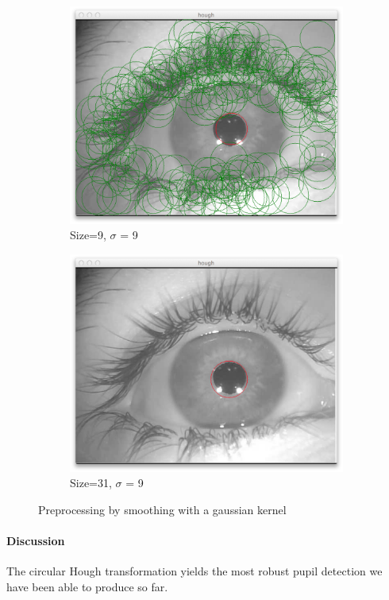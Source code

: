 \documentclass[a4paper,11pt]{article}
\begin{document}
\begin{figure}[H]
\centering
\begin{subfigure}{.5\textwidth}
  \centering
  \includegraphics[width=.8\linewidth]{houghk9s9}
  \caption{Size=9, $\sigma$ = 9}
  \label{fig:sub3}
\end{subfigure}%
\begin{subfigure}{.5\textwidth}
  \centering
  \includegraphics[width=.8\linewidth]{houghk31s9}
  \caption{Size=31, $\sigma$ = 9}
  \label{fig:sub4}
\end{subfigure}
\caption{Preprocessing by smoothing with a gaussian kernel}
\label{fig:test2}
\end{figure}

\paragraph{Discussion}
The circular Hough transformation yields the most robust pupil detection we have been able to produce so far.
\end{document}
